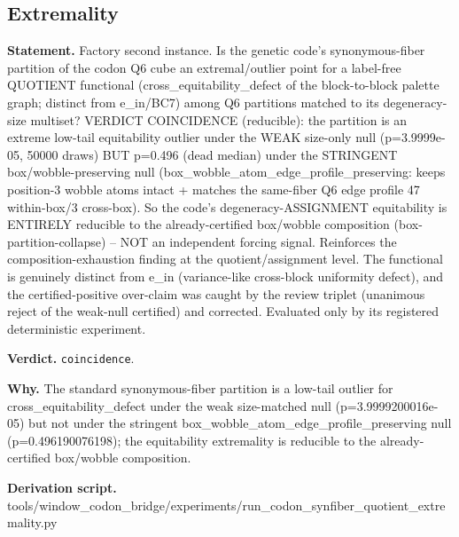\subsection{Extremality}\label{sec:bridge-extremality}
\textbf{Statement.} Factory second instance. Is the genetic code's synonymous-fiber partition of the codon Q6 cube an
extremal/outlier point for a label-free QUOTIENT functional (cross\_equitability\_defect of the
block-to-block palette graph; distinct from e\_in/BC7) among Q6 partitions matched to its
degeneracy-size multiset? VERDICT COINCIDENCE (reducible): the partition is an extreme low-tail
equitability outlier under the WEAK size-only null (p=3.9999e-05, 50000 draws) BUT p=0.496 (dead
median) under the STRINGENT box/wobble-preserving null
(box\_wobble\_atom\_edge\_profile\_preserving: keeps position-3 wobble atoms intact + matches the
same-fiber Q6 edge profile 47 within-box/3 cross-box). So the code's degeneracy-ASSIGNMENT
equitability is ENTIRELY reducible to the already-certified box/wobble composition
(box-partition-collapse) -- NOT an independent forcing signal. Reinforces the composition-exhaustion
finding at the quotient/assignment level. The functional is genuinely distinct from e\_in
(variance-like cross-block uniformity defect), and the certified-positive over-claim was caught by
the review triplet (unanimous reject of the weak-null certified) and corrected. Evaluated only by
its registered deterministic experiment.

\textbf{Verdict.} \texttt{coincidence}.

\textbf{Why.} The standard synonymous-fiber partition is a low-tail outlier for cross\_equitability\_defect under
the weak size-matched null (p=3.9999200016e-05) but not under the stringent
box\_wobble\_atom\_edge\_profile\_preserving null (p=0.496190076198); the equitability extremality
is reducible to the already-certified box/wobble composition.

\textbf{Derivation script.} tools/window\_codon\_bridge/experiments/run\_codon\_synfiber\_quotient\_extremality.py

